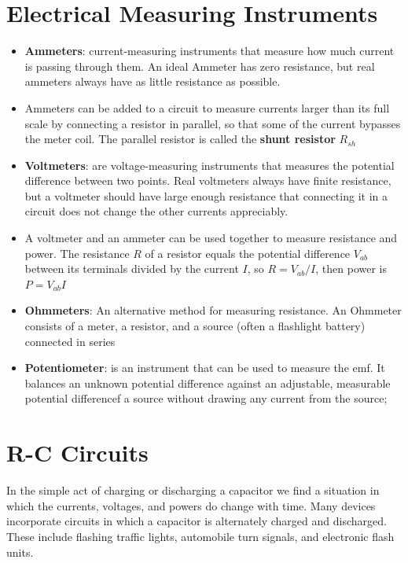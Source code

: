 \documentclass[11pt, a4paper]{article}
\begin{document}
\section[26.3, Electrical Measuring Instruments]{Electrical Measuring Instruments}
\begin{itemize}
    \item \textbf{Ammeters}: current-measuring instruments that measure how much current
        is passing through them. An ideal Ammeter has zero resistance, but real ammeters
        always have as little resistance as possible.
    \item Ammeters can be added to a circuit to measure currents larger than its full
        scale by connecting a resistor in parallel, so that some of the current bypasses
        the meter coil. The parallel resistor is called the \textbf{shunt resistor}
        $R_{sh}$
    \item \textbf{Voltmeters}: are voltage-measuring instruments that measures the
        potential difference between two points. Real voltmeters always have finite
        resistance, but a voltmeter should have large enough resistance that connecting
        it in a circuit does not change the other currents appreciably.
    \item A voltmeter and an ammeter can be used together to measure resistance and
        power. The resistance $R$ of a resistor equals the potential difference $V_{ab}$
        between its terminals divided by the current $I$, so $R = V_{ab}/I$, then power
        is $P = V_{ab}I$
    \item \textbf{Ohmmeters}: An alternative method for measuring resistance. An Ohmmeter
         consists of a meter, a resistor, and a source (often a flashlight battery)
         connected in series
     \item \textbf{Potentiometer}: is an instrument that can be used to measure the emf.
         It balances an unknown potential difference against an adjustable, measurable
         potential differencef a source without drawing any current from the source;
\end{itemize}

\section[26.4, R-C Circuits]{R-C Circuits}
In the simple act of charging or discharging a capacitor we find a situation in which
the currents, voltages, and powers do change with time.
Many devices incorporate circuits in which a capacitor is alternately charged and
discharged. These include flashing traffic lights, automobile turn signals, and
electronic flash units.
\end{document}
